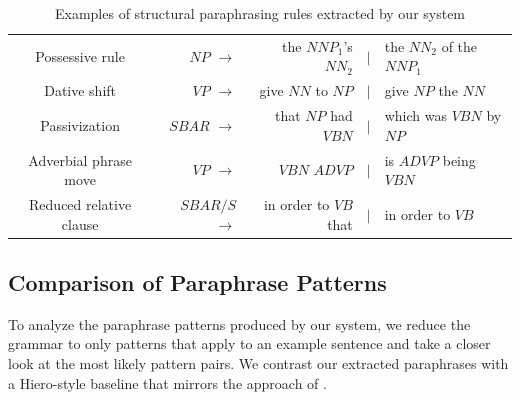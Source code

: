 \documentclass[11pt]{article}
\begin{document}
\begin{table}
  \begin{center}
  \begin{tabular}{|c|rrcl|}
    \hline
    Possessive rule & $\mathit{NP}$ $\rightarrow$  & the $\mathit{NNP}_1$'s
    $\mathit{NN}_2$ & $\mid$ & the $\mathit{NN}_2$ of the $\mathit{NNP}_1$
    \\

    Dative shift & $\mathit{VP}$ $\rightarrow$ & give $\mathit{NN}$ to
    $\mathit{NP}$ & $\mid$ & give $\mathit{NP}$ the $\mathit{NN}$ \\

    Passivization &
    $\mathit{SBAR}$ $\rightarrow$ & that $\mathit{NP}$ had
    $\mathit{VBN}$ & $\mid$ & which was $\mathit{VBN}$ by $\mathit{NP}$ \\

    Adverbial phrase move & 
    $\mathit{VP}$ $\rightarrow$ & $\mathit{VBN}$ $\mathit{ADVP}$ & $\mid$ & is
    $\mathit{ADVP}$ being $\mathit{VBN}$ \\

    Reduced relative clause & $\mathit{SBAR/S}$ $\rightarrow$ & in order
    to $\mathit{VB}$ that & $\mid$ & in order to $\mathit{VB}$ \\
    \hline
\end{tabular}
\end{center}
\caption{Examples of structural paraphrasing rules extracted by our system}
\end{table}

\subsection{Comparison of Paraphrase
  Patterns} \label{pattern_comparison}

To analyze the paraphrase patterns produced by our system, we reduce
the grammar to only patterns that apply to an example sentence and
take a closer look at the most likely pattern pairs. We contrast our
extracted paraphrases with a Hiero-style baseline that mirrors the
approach of . 
\end{document}
